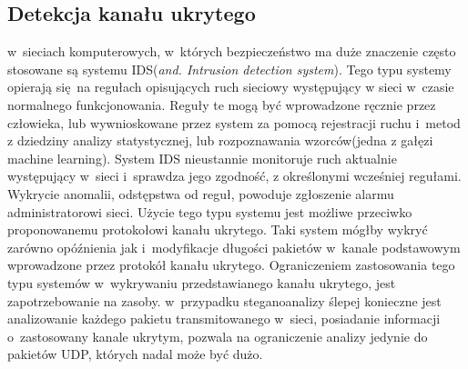 \documentclass[a4paper, twoside, 12pt]{report}
\begin{document}
       \subsection{Detekcja kanału ukrytego}
       w~sieciach komputerowych, w~których bezpieczeństwo ma duże znaczenie często
       stosowane są systemu IDS(\emph{and. Intrusion detection system}). Tego typu
       systemy opierają się na regułach opisujących ruch sieciowy występujący w
       sieci w~czasie normalnego funkcjonowania. Reguły te mogą być wprowadzone ręcznie
       przez człowieka, lub wywnioskowane przez system za pomocą rejestracji ruchu i~metod z dziedziny
       analizy statystycznej, lub rozpoznawania wzorców(jedna z gałęzi machine learning)\cite{IDSDESCRIPTION}.
       System IDS nieustannie monitoruje ruch aktualnie występujący w~sieci i~sprawdza
       jego zgodność, z określonymi wcześniej regułami. Wykrycie anomalii, odstępstwa
       od reguł, powoduje zgłoszenie alarmu administratorowi sieci. Użycie tego
       typu systemu jest możliwe przeciwko proponowanemu protokołowi kanału ukrytego.
       Taki system mógłby wykryć zarówno opóźnienia jak i~modyfikacje długości
       pakietów w~kanale podstawowym wprowadzone przez protokół kanału ukrytego.
       Ograniczeniem zastosowania tego typu systemów w~wykrywaniu przedstawianego kanału
       ukrytego, jest zapotrzebowanie na zasoby. w~przypadku steganoanalizy ślepej
       konieczne jest analizowanie każdego pakietu transmitowanego w~sieci, posiadanie
       informacji o~zastosowany kanale ukrytym, pozwala na ograniczenie analizy jedynie
       do pakietów UDP, których nadal może być dużo.
\end{document}

